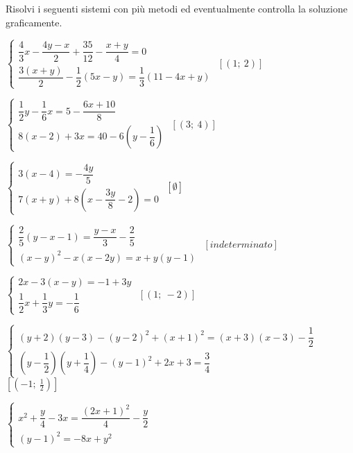 \begin{esercizio}[*]
 \label{ese:22.75}
 Risolvi i seguenti sistemi con più metodi ed eventualmente controlla
la soluzione graficamente.
\begin{enumeratea}
\item \(\left\{\begin{array}{l}
\dfrac{4}{3}x-\dfrac{4y-x}{2}+\dfrac{35}{12}-\dfrac{x+y}{4}=0\\
\dfrac{3(x+y)}{2}-\dfrac{1}{2}(5x-y)=\dfrac{1}{3}(11-4x+y)\end{array}
\right.\)
 \hfill \(\left[(1;~2)\right]\)
\item \(\left\{\begin{array}{l}
\dfrac{1}{2}y-\dfrac{1}{6}x=5-\dfrac{6x+10}{8}\\
8(x-2)+3x=40-6\left(y-\dfrac{1}{6}\right)\end{array}\right.\)
 \hfill \(\left[(3;~4)\right]\)
\item \(\left\{\begin{array}{l}
3(x-4)=-{\dfrac{4y}{5}}\\
7(x+y)+8\left(x-\dfrac{3y}{8}
-2\right)=0\end{array}\right.\)
 \hfill \(\left[\emptyset\right]\)
\item \(\left\{\begin{array}{l}
\dfrac{2}{5}(y-x-1)=\dfrac{y-x}{3}-\dfrac{2}{5}\\
(x-y)^{2}-x(x-2y)=x+y(y-1)\end{array}\right.\)
 \hfill \(\left[indeterminato\right]\)
\item \(\left\{\begin{array}{l}
2x-3(x-y)=-1+3y\\
\dfrac{1}{2}x+\dfrac{1}{3}y=-{\dfrac{1}{6}}\end{array}\right.\)
 \hfill \(\left[(1;~-2)\right]\)
\item \(\left\{\begin{array}{l}
(y+2)(y-3)-(y-2)^{2}+(x+1)^{2}=(x+3)(x-3)-\dfrac{1}{2}\\
\left(y-\dfrac{1}{2}\right)\left(y+\dfrac{1}{4}\right)-(y-1)^{2}+2x+3=
    \dfrac{3}{4}\end{array}\right.\)
 \hfill \(\left[(-1;~\frac{1}{2})\right]\)
\item \(\left\{\begin{array}{l}
x^{2}+\dfrac{y}{4}-3x=\dfrac{(2x+1)^{2}}{4}-\dfrac{y}{2}\\
(y-1)^{2}=-8x+y^{2}\end{array}\right.\)

\end{enumeratea}
\end{esercizio}
